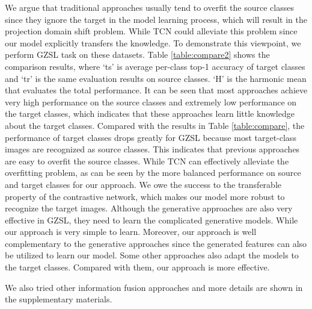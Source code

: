 \documentclass[10pt,twocolumn,letterpaper]{article}
\begin{document}
We argue that traditional approaches usually tend to overfit the source classes since they ignore the target in the model learning process, which will result in the projection domain shift problem. While TCN could alleviate this problem since our model explicitly transfers the knowledge. To demonstrate this viewpoint, we perform GZSL task on these datasets. Table \ref{table:compare2} shows the comparison results, where `ts' is average per-class top-1 accuracy of target classes and `tr' is the same evaluation results on source classes. `H' is the harmonic mean that evaluates the total performance. It can be seen that most approaches achieve very high performance on the source classes and extremely low performance on the target classes, which indicates that these approaches learn little knowledge about the target classes. Compared with the results in Table \ref{table:compare}, the performance of target classes drops greatly for GZSL because most target-class images are recognized as source classes. This indicates that previous approaches are easy to overfit the source classes. While TCN can effectively alleviate the overfitting problem, as can be seen by the more balanced performance on source and target classes for our approach. We owe the success to the transferable property of the contrastive network, which makes our model more robust to recognize the target images. Although the generative approaches \cite{xian2018feature,Zhu2018AGA} are also very effective in GZSL, they need to learn the complicated generative models. While our approach is very simple to learn. Moreover, our approach is well complementary to the generative approaches since the generated features can also be utilized to learn our model. Some other approaches \cite{jiang2018learning,Liu2018GeneralizedZL} also adapt the models to the target classes. Compared with them, our approach is more effective.

We also tried other information fusion approaches and more details are shown in the supplementary materials.
\end{document}
